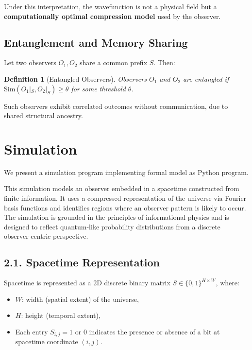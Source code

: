 \documentclass[11pt]{article}
\newtheorem{definition}{Definition}
\begin{document}
Under this interpretation, the wavefunction is not a physical field but a \textbf{computationally optimal compression model} used by the observer.

\subsection{Entanglement and Memory Sharing}

Let two observers \(O_1, O_2\) share a common prefix \(S\). Then:

\begin{definition}[Entangled Observers]
    Observers \(O_1\) and \(O_2\) are entangled if \(\mathrm{Sim}(O_1|_S, O_2|_S)\ge\theta\) for some threshold \(\theta\).
\end{definition}

Such observers exhibit correlated outcomes without communication, due to shared structural ancestry.


\section{Simulation}

We present a simulation program implementing formal model as Python program.

This simulation models an observer embedded in a spacetime constructed from finite information. It uses a compressed representation of the universe via Fourier basis functions and identifies regions where an observer pattern is likely to occur. The simulation is grounded in the principles of informational physics and is designed to reflect quantum-like probability distributions from a discrete observer-centric perspective.

\subsection*{2.1. Spacetime Representation}

Spacetime is represented as a 2D discrete binary matrix $S \in \{0, 1\}^{H \times W}$, where:
\begin{itemize}
    \item $W$: width (spatial extent) of the universe,
    \item $H$: height (temporal extent),
    \item Each entry $S_{i,j} = 1$ or $0$ indicates the presence or absence of a bit at spacetime coordinate $(i,j)$.
\end{itemize}
\end{document}
